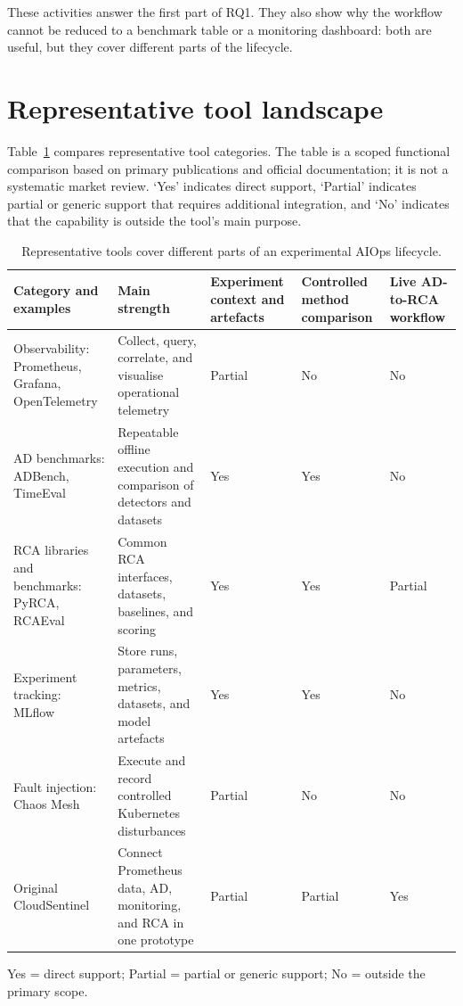 These activities answer the first part of RQ1. They also show why the workflow cannot be reduced to a benchmark table or a monitoring dashboard: both are useful, but they cover different parts of the lifecycle.

\section{Representative tool landscape}

Table~\ref{tab:tool-landscape} compares representative tool categories. The table is a scoped functional comparison based on primary publications and official documentation; it is not a systematic market review. `Yes' indicates direct support, `Partial' indicates partial or generic support that requires additional integration, and `No' indicates that the capability is outside the tool's main purpose.

\begin{table}[H]
    \centering
    \small
    \caption{Representative tools cover different parts of an experimental AIOps lifecycle.}
    \label{tab:tool-landscape}
    \begin{tabularx}{\textwidth}{p{2.7cm} X p{1.65cm} p{1.65cm} p{1.65cm}}
        \toprule
        Category and examples & Main strength & Experiment context and artefacts & Controlled method comparison & Live AD-to-RCA workflow \\
        \midrule
        Observability: Prometheus, Grafana, OpenTelemetry & Collect, query, correlate, and visualise operational telemetry & Partial & No & No \\
        AD benchmarks: ADBench, TimeEval & Repeatable offline execution and comparison of detectors and datasets & Yes & Yes & No \\
        RCA libraries and benchmarks: PyRCA, RCAEval & Common RCA interfaces, datasets, baselines, and scoring & Yes & Yes & Partial \\
        Experiment tracking: MLflow & Store runs, parameters, metrics, datasets, and model artefacts & Yes & Yes & No \\
        Fault injection: Chaos Mesh & Execute and record controlled Kubernetes disturbances & Partial & No & No \\
        Original CloudSentinel & Connect Prometheus data, AD, monitoring, and RCA in one prototype & Partial & Partial & Yes \\
        \bottomrule
    \end{tabularx}

    \vspace{0.4em}
    \footnotesize Yes = direct support; Partial = partial or generic support; No = outside the primary scope.
\end{table}

